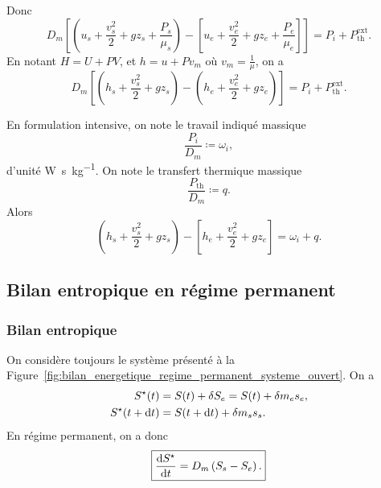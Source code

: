             Donc
            \begin{equation}
                D_m\left[\left(u_s+\frac{v_s^{2}}{2}+g z_s+\frac{P_s}{\mu_s}\right)-\left[u_e+\frac{v_e^{2}}{2}+g z_e+\frac{P_e}{\mu_e}\right]\right]=P_i+P_{\text{th}}^{\text{ext}}.
            \end{equation}
            En notant $H=U+PV$, et $h=u+Pv_m$ où $v_m=\frac{1}{\mu}$, on a
            \begin{equation}
                \boxed{
                    D_m\left[\left(h_s+\frac{v_s^{2}}{2}+g z_s\right)-\left(h_e+\frac{v_e^{2}}{2}+g z_e\right)\right]=P_i+P_{\text{th}}^{\text{ext}}.
                }
            \end{equation}

            En formulation intensive, on note le travail indiqué massique
            \begin{equation}
                \boxed{
                    \frac{P_i}{D_m}\coloneqq\omega_i,
                }
            \end{equation}
            d'unité \si[]{\watt\second\per\kilogram}. On note le transfert thermique massique 
            \begin{equation}
                \boxed{
                    \frac{P_{\text{th}}}{D_m}\coloneqq q.
                }
            \end{equation}
            Alors
            \begin{equation}
                \left(h_s+\frac{v_s^{2}}{2}+g z_s\right)-\left[h_e+\frac{v_e^{2}}{2}+g z_e\right]=\omega_i+q.
            \end{equation}

    \subsection{Bilan entropique en régime permanent}
        
        \subsubsection{Bilan entropique}
            
            On considère toujours le système présenté à la Figure~\ref{fig:bilan_energetique_regime_permanent_systeme_ouvert}. On a 
            \begin{equation}
                \begin{aligned}
                    S^{\star}(t)&= S(t)+\delta S_e=S(t)+\delta m_e s_e,\\
                    S^{\star}(t+\mathrm{d} t)&= S(t+\mathrm{d} t)+\delta m_s s_s.
                \end{aligned}
            \end{equation}
            En régime permanent, on a donc
            \begin{equation}
                \boxed{
                    \frac{\mathrm{d} S^{\star}}{\mathrm{d} t}=D_m\left(S_s-S_e\right).
                }
            \end{equation}

